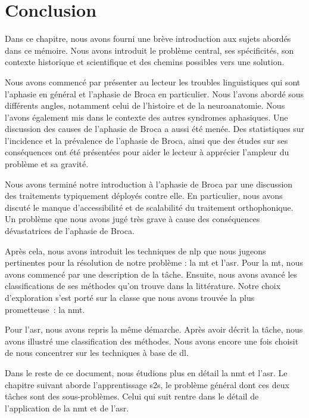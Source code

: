 \section{Conclusion}%
\label{sec.general_notions.conclusion}

Dans ce chapitre, nous avons fourni une brève introduction aux sujets abordés dans ce mémoire.
Nous avons introduit le problème central, ses spécificités, son contexte historique et scientifique 
et des chemins possibles vers une solution.

Nous avons commencé par présenter au lecteur les troubles linguistiques qui sont 
l'aphasie en général et l'aphasie de Broca en particulier.
Nous l'avons abordé sous différents angles, notamment celui de l'histoire et de la neuroanatomie.
Nous l'avons également mis dans le contexte des autres syndromes aphasiques.
Une discussion des causes de l'aphasie de Broca a aussi été menée.
Des statistiques sur l'incidence et la prévalence de l'aphasie de Broca,
ainsi que des études sur ses conséquences ont été présentées
pour aider le lecteur à apprécier l'ampleur du problème et sa gravité.

Nous avons terminé notre introduction à l'aphasie de Broca 
par une discussion des traitements typiquement déployés contre elle.
En particulier, nous avons discuté le manque d'accessibilité et de scalabilité du traitement orthophonique.
Un problème que nous avons jugé très grave à cause des conséquences dévastatrices de l'aphasie de Broca.

Après cela, nous avons introduit les techniques de \gls{nlp} que nous jugeons pertinentes
pour la résolution de notre problème : la \gls{mt} et l'\gls{asr}.
Pour la \gls{mt}, nous avons commencé par une description de la tâche.
Ensuite, nous avons avancé les classifications de ses méthodes qu'on trouve dans la littérature.
Notre choix d'exploration s'est porté sur la classe que nous avons trouvée la plus prometteuse~:
la \gls{nmt}.

Pour l'\gls{asr}, nous avons repris la même démarche.
Après avoir décrit la tâche, nous avons illustré une classification des méthodes.
Nous avons encore une fois choisit de nous concentrer sur les techniques à base de \gls{dl}.

Dans le reste de ce document, nous étudions plus en détail la \gls{nmt} et l'\gls{asr}.
Le chapitre suivant aborde l'apprentissage \gls{s2s}, 
le problème général dont ces deux tâches sont des sous-problèmes.
Celui qui suit rentre dans le détail de l'application de la \gls{nmt} et de l'\gls{asr}.
